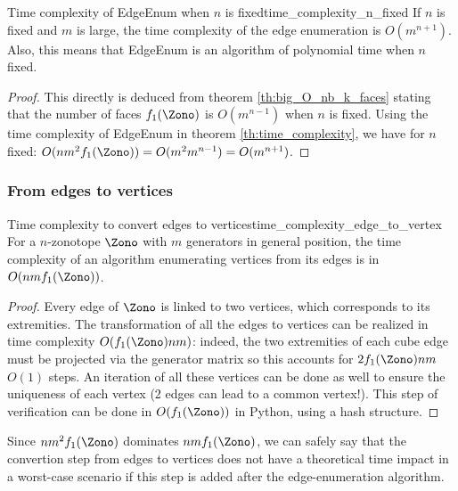 \begin{theorembox}{Time complexity of EdgeEnum when $n$ is fixed}{time_complexity_n_fixed}
    If $n$ is fixed and $m$ is large, the time complexity of the edge enumeration is $O\left( m^{n+1} \right)$. Also, this means that EdgeEnum is an algorithm of polynomial time when $n$ fixed.
\end{theorembox}
\begin{proof}
    This directly is deduced from theorem \ref{th:big_O_nb_k_faces} stating that the number of faces $f_1(\Zono)$ is $O(m^{n-1})$ when $n$ is fixed. Using the time complexity of EdgeEnum in theorem \ref{th:time_complexity}, we have for $n$ fixed:
    $O(nm^2f_1(\Zono)) = O(m^2m^{n-1}) = O(m^{n+1})$.
\end{proof}

\subsubsection*{From edges to vertices}
\begin{theorembox}{Time complexity to convert edges to vertices}{time_complexity_edge_to_vertex}
    For a $n$-zonotope $\Zono$ with $m$ generators in general position, the time complexity of an algorithm enumerating vertices from its edges is in $O(nmf_1(\Zono))$.
\end{theorembox}
\begin{proof}
Every edge of $\Zono$ is linked to two vertices, which corresponds to its extremities. The transformation of all the edges to vertices can be realized in time complexity $O(f_1(\Zono)nm)$: indeed, the two extremities of each cube edge must be projected via the generator matrix so this accounts for $2f_1(\Zono)nm$ $O(1)$ steps. An iteration of all these vertices can be done as well to ensure the uniqueness of each vertex (2 edges can lead to a common vertex!). This step of verification can be done in $O(f_1(\Zono))$ in Python, using a hash structure.
\end{proof}
Since $nm^2f_1(\Zono)$ dominates $nmf_1(\Zono)$, we can safely say that the convertion step from edges to vertices does not have a theoretical time impact in a worst-case scenario if this step is added after the edge-enumeration algorithm.


